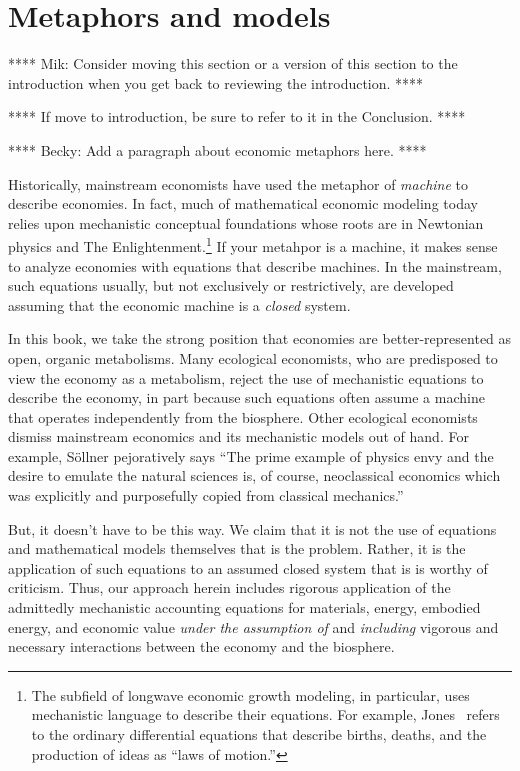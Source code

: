 \section{Metaphors and models}
\label{sec:metaphors_and_models}

**** Mik: Consider moving this section or a version of this section 
to the introduction when you get back to reviewing the introduction. ****

**** If move to introduction, be sure to refer to it in the Conclusion. ****

**** Becky: Add a paragraph about economic metaphors here. ****

Historically, mainstream economists have used the metaphor of \emph{machine}
to describe economies. 
In fact, much of mathematical economic modeling today 
relies upon mechanistic conceptual foundations whose roots 
are in Newtonian physics 
and The Enlightenment.\footnote{The subfield 
of longwave economic growth modeling, in particular, 
uses mechanistic language to describe their equations. 
For example, Jones~\cite[pp. 6 \& 18]{Jones:2001wn} 
refers to the ordinary differential equations 
that describe births, deaths, and the production of ideas
as ``laws of motion.''}
If your metahpor is a machine, it makes sense to analyze economies
with equations that describe machines.
In the mainstream, such equations usually, but not exclusively or restrictively,
are developed assuming that the economic machine is a \emph{closed} system.

In this book, we take the strong position that economies are
better-represented as open, organic metabolisms.
Many ecological economists, 
who are predisposed to view the economy as a metabolism,
reject the use of mechanistic equations 
to describe the economy, in part because such equations often assume a 
machine that operates independently from the biosphere.
Other ecological economists dismiss mainstream economics 
and its mechanistic models out of hand. 
For example, S{\"o}llner pejoratively says 
``The prime example of physics envy and the desire 
to emulate the natural sciences is, of course, 
neoclassical economics which was explicitly and purposefully 
copied from classical mechanics.''~\cite[p. 178]{Sollner:1997wx}

But, it doesn't have to be this way.
We claim that it is not the use of equations 
and mathematical models themselves that is the problem.
Rather, it is the application of such equations 
to an assumed closed system
that is is worthy of criticism.
Thus, our approach herein includes rigorous application of the 
admittedly mechanistic accounting equations 
for materials, energy, embodied energy, and economic value
\emph{under the assumption of} and \emph{including} 
vigorous and necessary interactions between
the economy and the biosphere.

